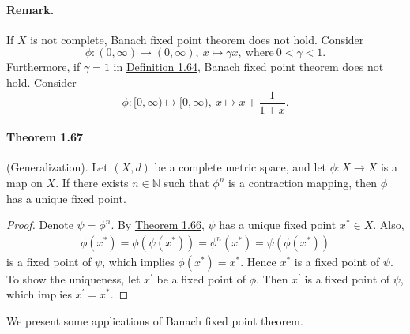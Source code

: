 \documentclass{article}
\begin{document}
\paragraph{Remark.} If $X$ is not complete, Banach fixed point theorem does not hold. Consider 
$$\phi:(0,\infty)\to(0,\infty),\ x\mapsto \gamma x,\ \text{where}\ 0< \gamma < 1.$$ 
Furthermore, if $\gamma=1$ in \hyperref[def:1.64]{Definition 1.64}, Banach fixed point theorem does not hold. Consider
$$\phi:[0,\infty)\mapsto[0,\infty),\ x\mapsto x+\frac{1}{1+x}.$$

\paragraph{Theorem 1.67\label{thm:1.67}} (Generalization). Let $(X,d)$ be a complete metric space, and let $\phi:X\to X$ is a map on $X$. If there exists $n\in\mathbb{N}$ such that $\phi^n$ is a contraction mapping, then $\phi$ has a unique fixed point.
\begin{proof}
Denote $\psi = \phi^n$. By \hyperref[thm:1.66]{Theorem 1.66}, $\psi$ has a unique fixed point $x^*\in X$. Also,
\begin{align*}
	\phi(x^*) = \phi\left(\psi(x^*)\right) = \phi^n(x^*) = \psi\left(\phi(x^*)\right)
\end{align*}
is a fixed point of $\psi$, which implies $\phi(x^*)=x^*$. Hence $x^*$ is a fixed point of $\psi$. To show the uniqueness, let $x^\prime$ be a fixed point of $\phi$. Then $x^\prime$ is a fixed point of $\psi$, which implies $x^\prime=x^*$.
\end{proof}

We present some applications of Banach fixed point theorem.
\end{document}
